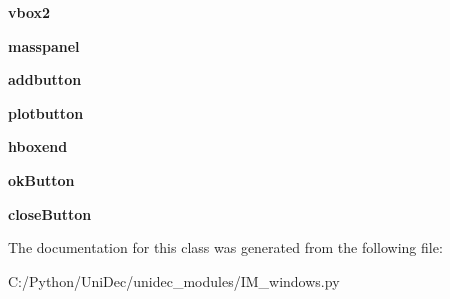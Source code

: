 \begin{DoxyCompactItemize}
\item 
\hypertarget{class_uni_dec_1_1unidec__modules_1_1_i_m__windows_1_1_i_m_tools_a966203d47946731fbc194954ead952d6}{}{\bfseries vbox2}\label{class_uni_dec_1_1unidec__modules_1_1_i_m__windows_1_1_i_m_tools_a966203d47946731fbc194954ead952d6}

\item 
\hypertarget{class_uni_dec_1_1unidec__modules_1_1_i_m__windows_1_1_i_m_tools_ae803f9fde30f1378971c56f0150e7535}{}{\bfseries masspanel}\label{class_uni_dec_1_1unidec__modules_1_1_i_m__windows_1_1_i_m_tools_ae803f9fde30f1378971c56f0150e7535}

\item 
\hypertarget{class_uni_dec_1_1unidec__modules_1_1_i_m__windows_1_1_i_m_tools_ac4fe8f0d942b30bf37ee83449db2971f}{}{\bfseries addbutton}\label{class_uni_dec_1_1unidec__modules_1_1_i_m__windows_1_1_i_m_tools_ac4fe8f0d942b30bf37ee83449db2971f}

\item 
\hypertarget{class_uni_dec_1_1unidec__modules_1_1_i_m__windows_1_1_i_m_tools_af3fc0fe0693e18804c2696217b0229f5}{}{\bfseries plotbutton}\label{class_uni_dec_1_1unidec__modules_1_1_i_m__windows_1_1_i_m_tools_af3fc0fe0693e18804c2696217b0229f5}

\item 
\hypertarget{class_uni_dec_1_1unidec__modules_1_1_i_m__windows_1_1_i_m_tools_ae3c3fde927ab01762ad9615672a37b99}{}{\bfseries hboxend}\label{class_uni_dec_1_1unidec__modules_1_1_i_m__windows_1_1_i_m_tools_ae3c3fde927ab01762ad9615672a37b99}

\item 
\hypertarget{class_uni_dec_1_1unidec__modules_1_1_i_m__windows_1_1_i_m_tools_ae0e333fef7e047a51a24a6e898bda173}{}{\bfseries ok\+Button}\label{class_uni_dec_1_1unidec__modules_1_1_i_m__windows_1_1_i_m_tools_ae0e333fef7e047a51a24a6e898bda173}

\item 
\hypertarget{class_uni_dec_1_1unidec__modules_1_1_i_m__windows_1_1_i_m_tools_a6fda97f5ee7924315afb29a1e234984d}{}{\bfseries close\+Button}\label{class_uni_dec_1_1unidec__modules_1_1_i_m__windows_1_1_i_m_tools_a6fda97f5ee7924315afb29a1e234984d}

\end{DoxyCompactItemize}


The documentation for this class was generated from the following file\+:\begin{DoxyCompactItemize}
\item 
C\+:/\+Python/\+Uni\+Dec/unidec\+\_\+modules/I\+M\+\_\+windows.\+py\end{DoxyCompactItemize}
